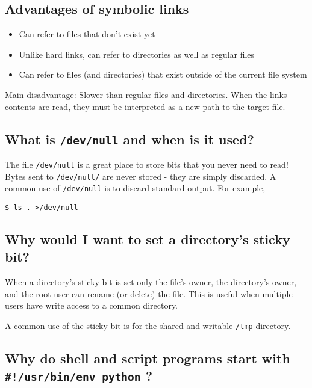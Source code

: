 \subsection{Advantages of symbolic
links}\label{advantages-of-symbolic-links}

\begin{itemize}
\tightlist
\item
  Can refer to files that don't exist yet
\item
  Unlike hard links, can refer to directories as well as regular files
\item
  Can refer to files (and directories) that exist outside of the current
  file system
\end{itemize}

Main disadvantage: Slower than regular files and directories. When the
links contents are read, they must be interpreted as a new path to the
target file.

\subsection{\texorpdfstring{What is \texttt{/dev/null} and when is it
used?}{What is /dev/null and when is it used?}}\label{what-is-devnull-and-when-is-it-used}

The file \texttt{/dev/null} is a great place to store bits that you
never need to read! Bytes sent to \texttt{/dev/null/} are never stored -
they are simply discarded. A common use of \texttt{/dev/null} is to
discard standard output. For example,

\begin{verbatim}
$ ls . >/dev/null
\end{verbatim}

\subsection{Why would I want to set a directory's sticky
bit?}\label{why-would-i-want-to-set-a-directorys-sticky-bit}

When a directory's sticky bit is set only the file's owner, the
directory's owner, and the root user can rename (or delete) the file.
This is useful when multiple users have write access to a common
directory.

A common use of the sticky bit is for the shared and writable
\texttt{/tmp} directory.

\subsection{\texorpdfstring{Why do shell and script programs start with
\texttt{\#!/usr/bin/env\ python}
?}{Why do shell and script programs start with \#!/usr/bin/env python ?}}\label{why-do-shell-and-script-programs-start-with-usrbinenv-python}

